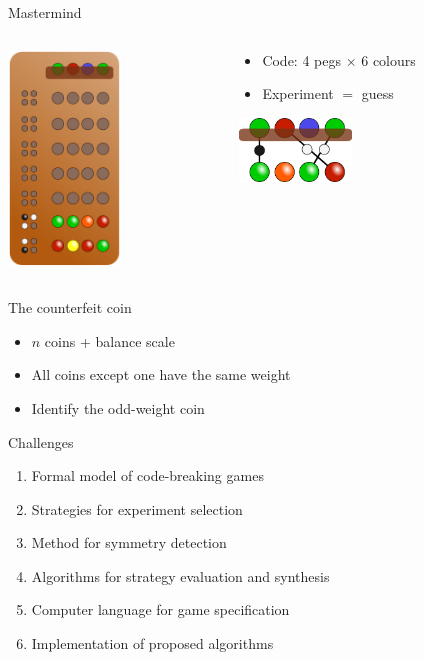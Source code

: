\documentclass{beamer}
\begin{document}
\begin{frame}{Mastermind}
\begin{columns}
 \begin{column}{.35\textwidth}
 \centering
 \includegraphics[width=3cm]{../pictures/mastermind.png}
 \end{column}

 \begin{column}{.6\textwidth}
  \begin{itemize}
  \item Code: 4 pegs $\times$ 6 colours
  \item Experiment $=$ guess
  \end{itemize}
  \begin{center}
  \includegraphics[width=3cm]{../pictures/mastermind-matching.png}
  \end{center}
 \end{column}
\end{columns}
\end{frame}

\begin{frame}{The counterfeit coin}
\begin{itemize}\itemsep 3ex
\item $n$ coins + balance scale
\item All coins except one have the same weight
\item Identify the odd-weight coin
\end{itemize}
\end{frame}

\begin{frame}{Challenges}
\begin{enumerate}\itemsep 2ex
\item Formal model of code-breaking games
\item Strategies for experiment selection
\item Method for symmetry detection
\item Algorithms for strategy evaluation and synthesis
\item Computer language for game specification
\item Implementation of proposed algorithms
\end{enumerate}
\end{frame}
\end{document}
